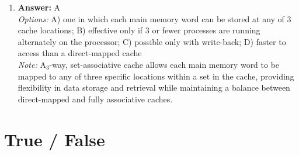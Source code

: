 \documentclass[12pt]{article}
\begin{document}
\begin{enumerate}[label=\arabic*.]
\item \textbf{Answer:} A
\\ \textit{Options:} A) one in which each main memory word can be stored at any of 3 cache locations; B) effective only if 3 or fewer processes are running alternately on the processor; C) possible only with write-back; D) faster to access than a direct-mapped cache
\\ \textit{Note:} A$_{3}$-way, set-associative cache allows each main memory word to be mapped to any of three specific locations within a set in the cache, providing flexibility in data storage and retrieval while maintaining a balance between direct-mapped and fully associative caches.
\end{enumerate}

\section*{True / False}
\end{document}
